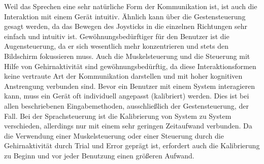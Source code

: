 \newline \newline
Weil das Sprechen eine sehr natürliche Form der Kommunikation ist, ist auch die Interaktion mit einem Gerät intuitiv. Ähnlich kann über die Gestensteuerung gesagt werden, da das Bewegen des Joysticks in die einzelnen Richtungen sehr einfach und intuitiv ist. Gewöhnungsbedürftiger für den Benutzer ist die Augensteuerung, da er sich wesentlich mehr konzentrieren und stets den Bildschirm fokussieren muss. Auch die Muskelsteuerung und die Steuerung mit Hilfe von Gehirnaktivität sind gewöhnungsbedürftig, da diese Interaktionsformen keine vertraute Art der Kommunikation darstellen und mit hoher kognitiven Anstrengung verbunden sind.
\newline \newline
Bevor ein Benutzer mit einem System interagieren kann, muss ein Gerät oft individuell angepasst (kalibriert) werden. Dies ist bei allen beschriebenen Eingabemethoden, ausschließlich der Gestensteuerung, der Fall. Bei der Sprachsteuerung ist die Kalibrierung von System zu System verschieden, allerdings nur mit einem sehr geringen Zeitaufwand verbunden. Da die Verwendung einer Muskelsteuerung oder einer Steuerung durch die Gehirnaktivität durch Trial und Error geprägt ist, erfordert auch die Kalibrierung zu Beginn und vor jeder Benutzung einen größeren Aufwand.
\newpage
%
%
